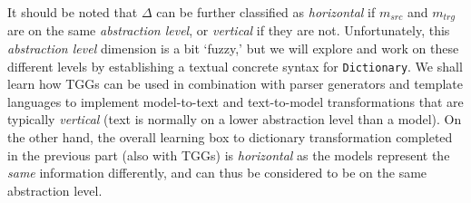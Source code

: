 It should be noted that $\Delta$ can be further classified as \emph{horizontal} if $m_{src}$ and $m_{trg}$ are on the same \emph{abstraction level}, or
\emph{vertical} if they are not. Unfortunately, this \emph{abstraction level} dimension is a bit `fuzzy,' but we will explore and work on these different levels
by establishing a textual concrete syntax for \texttt{Dictionary}. We shall learn how TGGs can be used in combination with parser generators
and template languages to implement model-to-text and text-to-model transformations that are typically \emph{vertical} (text is normally on a lower abstraction
level than a model). On the other hand, the overall learning box to dictionary transformation completed in the previous part (also with TGGs) is
\emph{horizontal} as the models represent the \emph{same} information differently, and can thus be considered to be on the same abstraction level.


